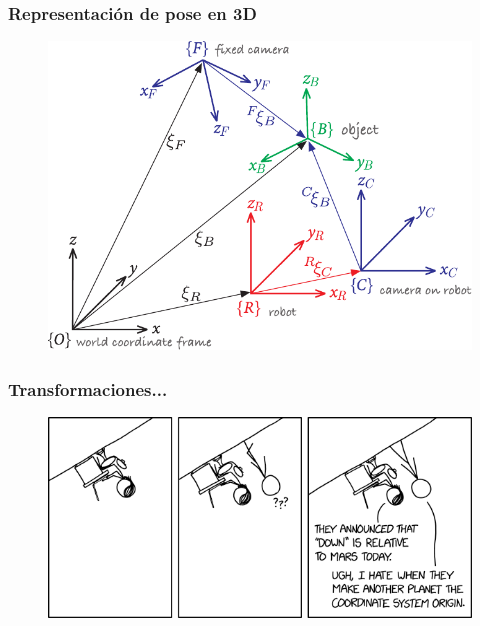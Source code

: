 \begin{frame}
    \frametitle{Representación de pose en 3D}

    \begin{figure}[!h]
        \includegraphics[width=0.6\columnwidth]{./images/multiple_coordinate_frames_3d.pdf}
    \end{figure}

\end{frame}

\begin{frame}
	\frametitle{Transformaciones...}
	
	\begin{figure}[!h]
		\includegraphics[width=\columnwidth]{./images/joke_coordinate_systems.png}
	\end{figure}
	
\end{frame}


